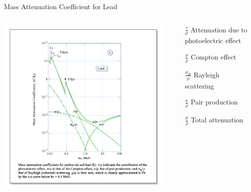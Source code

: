 %        
%
%
\begin{frame}{Mass Attenuation Coefficient for Lead}
    \begin{columns}[c, onlytextwidth]
        \begin{column}{0.5\textwidth}
            \begin{center}\includegraphics[height=0.8\textheight, trim={2cm  3.5cm 2cm 2cm},clip ]{images/lead_attenuation_mit_opencourse_ware.jpg}\end{center}
        \end{column}\begin{column}{0.5\textwidth}
            \begin{itemize}
                \item[$ \frac{\tau}{\rho}$] Attenuation due to photoelectric effect
                \item[$ \frac{\sigma}{\rho}$] Compton effect
                \item[$ \frac{\sigma_R}{\rho}$] Rayleigh scattering
                \item[$ \frac{\kappa}{\rho}$] Pair production
                \item[$ \frac{\mu}{\rho}$] Total attenuation


\end{itemize}
\end{column}
\end{columns}
\end{frame}
